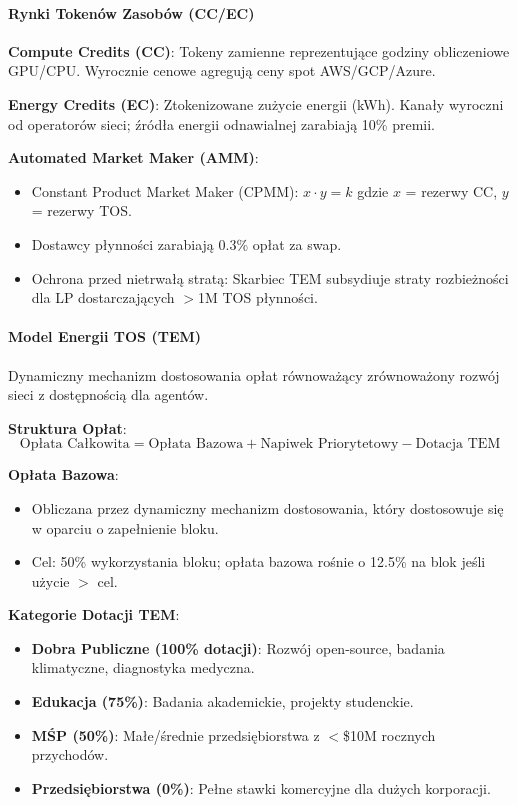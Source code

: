 \documentclass[11pt]{article}
\begin{document}
\paragraph{Rynki Tokenów Zasobów (CC/EC)}
\textbf{Compute Credits (CC)}: Tokeny zamienne reprezentujące godziny obliczeniowe GPU/CPU. Wyrocznie cenowe agregują ceny spot AWS/GCP/Azure.

\textbf{Energy Credits (EC)}: Ztokenizowane zużycie energii (kWh). Kanały wyroczni od operatorów sieci; źródła energii odnawialnej zarabiają 10\% premii.

\textbf{Automated Market Maker (AMM)}:
\begin{itemize}[noitemsep]
  \item Constant Product Market Maker (CPMM): $x \cdot y = k$ gdzie $x$ = rezerwy CC, $y$ = rezerwy TOS.
  \item Dostawcy płynności zarabiają 0.3\% opłat za swap.
  \item Ochrona przed nietrwałą stratą: Skarbiec TEM subsydiuje straty rozbieżności dla LP dostarczających $>$1M TOS płynności.
\end{itemize}

\paragraph{Model Energii TOS (TEM)}
Dynamiczny mechanizm dostosowania opłat równoważący zrównoważony rozwój sieci z dostępnością dla agentów.

\textbf{Struktura Opłat}:
\begin{equation}
\text{Opłata Całkowita} = \text{Opłata Bazowa} + \text{Napiwek Priorytetowy} - \text{Dotacja TEM}
\end{equation}

\textbf{Opłata Bazowa}:
\begin{itemize}[noitemsep]
  \item Obliczana przez dynamiczny mechanizm dostosowania, który dostosowuje się w oparciu o zapełnienie bloku.
  \item Cel: 50\% wykorzystania bloku; opłata bazowa rośnie o 12.5\% na blok jeśli użycie $>$ cel.
\end{itemize}

\textbf{Kategorie Dotacji TEM}:
\begin{itemize}[noitemsep]
  \item \textbf{Dobra Publiczne (100\% dotacji)}: Rozwój open-source, badania klimatyczne, diagnostyka medyczna.
  \item \textbf{Edukacja (75\%)}: Badania akademickie, projekty studenckie.
  \item \textbf{MŚP (50\%)}: Małe/średnie przedsiębiorstwa z $<$\$10M rocznych przychodów.
  \item \textbf{Przedsiębiorstwa (0\%)}: Pełne stawki komercyjne dla dużych korporacji.
\end{itemize}
\end{document}
